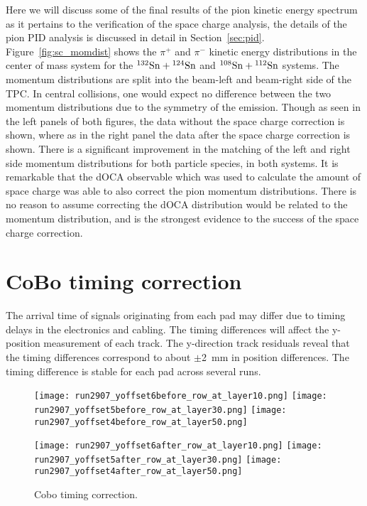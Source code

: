 Here we will discuss some of the final results of the pion kinetic energy spectrum as it pertains to the verification of the space charge analysis,  the details of the pion PID analysis is discussed in detail in Section~\ref{sec:pid}. Figure~\ref{fig:sc_momdist} shows the $\pi^+$ and $\pi^-$ kinetic energy distributions in the center of mass system for the ${}^{132}\mathrm{Sn} + {}^{124}\mathrm{Sn}$ and ${}^{108}\mathrm{Sn} + {}^{112}\mathrm{Sn}$ systems. The momentum distributions are split into the beam-left and beam-right side of the TPC. In central collisions, one would expect no difference between the two momentum distributions due to the symmetry of the emission. Though as seen in the left panels of both figures, the data without the space charge correction is shown, where as in the right panel the data after the space charge correction is shown. There is a significant improvement in the matching of the left and right side momentum distributions for both particle species, in both systems.   It is remarkable that the dOCA observable which was used to calculate the amount of space charge was able to also correct the pion momentum distributions. There is no reason to assume correcting the dOCA distribution would be related to the momentum distribution, and is the strongest evidence to the success of the space charge correction.



\section{CoBo timing correction}
The arrival time of signals originating from each pad may differ due to timing delays in the electronics and cabling. The timing differences will affect the y-position measurement of each track. The y-direction track residuals reveal that the timing differences correspond to about $\pm$\SI{2}{\milli\metre} in position differences. The timing difference is stable for each pad across several runs.

\begin{figure}[!htb]
  \begin{center}
    \texttt{[image: run2907\_yoffset6before\_row\_at\_layer10.png]}
    \texttt{[image: run2907\_yoffset5before\_row\_at\_layer30.png]}
    \texttt{[image: run2907\_yoffset4before\_row\_at\_layer50.png]}
 
    \texttt{[image: run2907\_yoffset6after\_row\_at\_layer10.png]}
    \texttt{[image: run2907\_yoffset5after\_row\_at\_layer30.png]}
    \texttt{[image: run2907\_yoffset4after\_row\_at\_layer50.png]}
 
  \end{center}
  \caption{Cobo timing correction.}
  \label{fig:coboCorr}
\end{figure}



